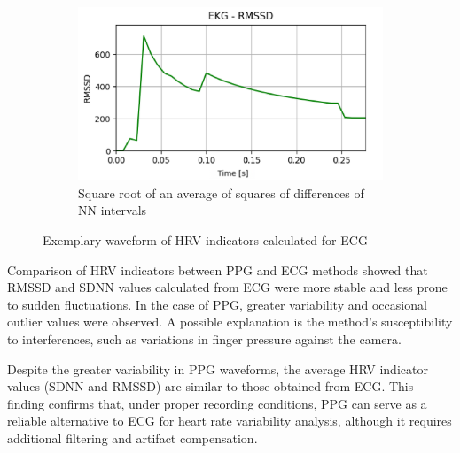 \documentclass{citask}
\begin{document}
\begin{figure}[h]
    \vspace{0.2cm}  
    \begin{subfigure}{0.47\textwidth}
        \centering
        \includegraphics[width=\linewidth]{RMSSD_EKG.png}
        \caption{Square root of an average of squares of differences of NN intervals}
    \end{subfigure}  
    \caption{Exemplary waveform of HRV indicators calculated for ECG}
\end{figure}

Comparison of HRV indicators between PPG and ECG methods showed that RMSSD and SDNN values calculated from ECG were more stable and less prone to sudden fluctuations. In the case of PPG, greater variability and occasional outlier values were observed. A possible explanation is the method's susceptibility to interferences, such as variations in finger pressure against the camera.

Despite the greater variability in PPG waveforms, the average HRV indicator values (SDNN and RMSSD) are similar to those obtained from ECG. This finding confirms that, under proper recording conditions, PPG can serve as a reliable alternative to ECG for heart rate variability analysis, although it requires additional filtering and artifact compensation.
\end{document}
